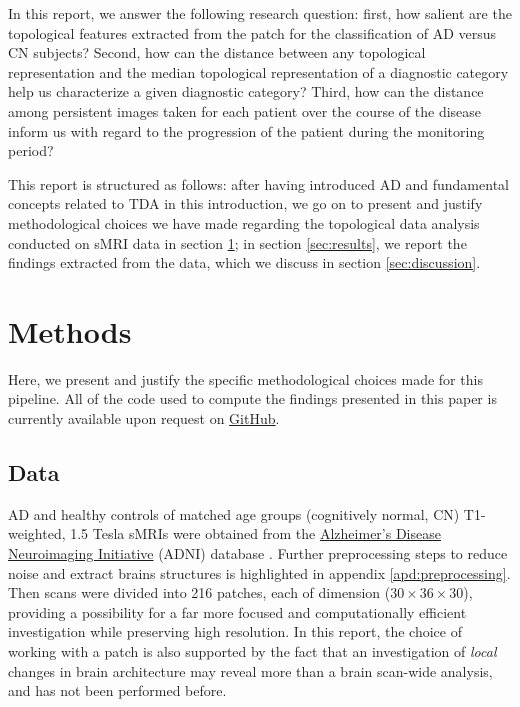 \documentclass{article}
\begin{document}
In this report, we answer the following research question: first, how salient are the topological features extracted from the patch for the classification of AD versus CN subjects? Second, how can the distance between any topological representation and the median topological representation of a diagnostic category help us characterize a given diagnostic category? Third, how can the distance among persistent images taken for each patient over the course of the disease inform us with regard to the progression of the patient during the monitoring period?

This report is structured as follows: after having introduced AD and fundamental concepts related to TDA in this introduction, we go on to present and justify methodological choices we have made regarding the topological data analysis conducted on sMRI data in section \ref{sec:methods}; in section \ref{sec:results}, we report the findings extracted from the data, which we discuss in section \ref{sec:discussion}.

\section{Methods}\label{sec:methods}

Here, we present and justify the specific methodological choices made for this pipeline. All of the code used to compute the findings presented in this paper is currently available upon request on \href{https://github.com/pjhartout/TDA_ADNI_MLCB}{GitHub}.

\subsection{Data}

AD and healthy controls of matched age groups (cognitively normal, CN) T1-weighted, 1.5 Tesla sMRIs were obtained from the \href{adni.loni.usc.edu}{Alzheimer's Disease Neuroimaging Initiative} (ADNI) database \citep{jack2008alzheimer}. Further preprocessing steps to reduce noise and extract brains structures is highlighted in appendix \ref{apd:preprocessing}. Then scans were divided into 216 patches, each of dimension ($30\times36\times30$), providing a possibility for a far more focused and computationally efficient investigation while preserving high resolution. In this report, the choice of working with a patch is also supported by the fact that an investigation of \emph{local} changes in brain architecture may reveal more than a brain scan-wide analysis, and has not been performed before.
\end{document}
